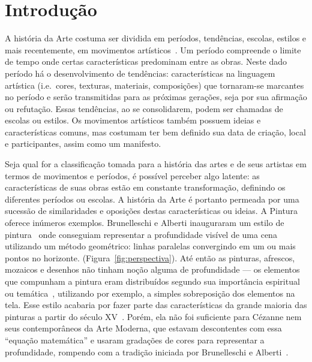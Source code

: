 

\afterpage{\blankpage}
\chapter{Introdução}
\label{cap:intro} 

A história da Arte costuma ser dividida em períodos, tendências,
escolas, estilos e mais recentemente, em movimentos
artísticos~\cite{dempsey}. Um período compreende o limite de tempo
onde certas características predominam entre as obras. Neste dado
período há o desenvolvimento de tendências: características na
linguagem artística (i.e.\ cores, texturas, materiais, composições)
que tornaram-se marcantes no período e serão transmitidas para as
próximas gerações, seja por sua afirmação ou refutação. Essas
tendências, ao se consolidarem, podem ser chamadas de escolas ou
estilos. Os movimentos artísticos também possuem ideias e
características comuns, mas costumam ter bem definido sua data de
criação, local e participantes, assim como um manifesto.

Seja qual for a classificação tomada para a história das artes e de
seus artistas em termos de movimentos e períodos, é possível perceber
algo latente: as características de suas obras estão em constante
transformação, definindo os diferentes períodos ou escolas. A história
da Arte é portanto permeada por uma sucessão de similaridades e
oposições destas características ou ideias. A Pintura oferece inúmeros
exemplos. Brunelleschi e Alberti inauguraram um estilo de
pintura~\cite{andersen,kemp} onde conseguiam representar a
profundidade visível de uma cena utilizando um método geométrico:
linhas paralelas convergindo em um ou mais pontos no horizonte.
(Figura~\ref{fig:perspectiva}). Até então as pinturas, afrescos,
mozaicos e desenhos não tinham noção alguma de profundidade --- os
elementos que compunham a pintura eram distribuídos segundo sua
importância espiritual ou temática~\cite{edgerton}, utilizando por
exemplo, a simples sobreposição dos elementos na tela. Esse estilo
acabaria por fazer parte das características da grande maioria das
pinturas a partir do século XV~\cite{gombrich}. Porém, ela não foi
suficiente para Cézanne nem seus contemporâneos da Arte Moderna, que
estavam descontentes com essa ``equação matemática'' e usaram
gradações de cores para representar a profundidade, rompendo com a
tradição iniciada por Brunelleschi e Alberti~\cite{sedlmayr}.

